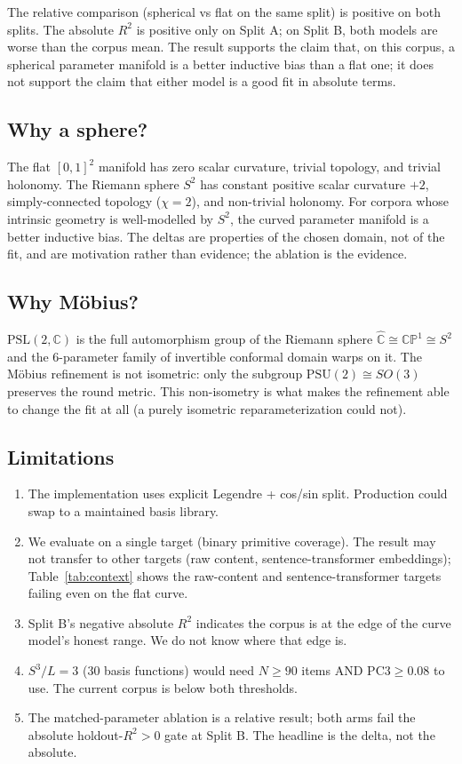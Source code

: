 \documentclass[11pt,a4paper]{article}
\begin{document}
The relative comparison (spherical vs flat on the same split) is positive on both splits. The absolute $R^2$ is positive only on Split A; on Split B, both models are worse than the corpus mean. The result supports the claim that, on this corpus, a spherical parameter manifold is a better inductive bias than a flat one; it does not support the claim that either model is a good fit in absolute terms.

\subsection{Why a sphere?}

The flat $[0,1]^2$ manifold has zero scalar curvature, trivial topology, and trivial holonomy. The Riemann sphere $S^2$ has constant positive scalar curvature $+2$, simply-connected topology ($\chi = 2$), and non-trivial holonomy. For corpora whose intrinsic geometry is well-modelled by $S^2$, the curved parameter manifold is a better inductive bias. The deltas are properties of the chosen domain, not of the fit, and are motivation rather than evidence; the ablation is the evidence.

\subsection{Why Möbius?}

$\mathrm{PSL}(2,\mathbb{C})$ is the full automorphism group of the Riemann sphere $\widehat{\mathbb{C}} \cong \mathbb{CP}^1 \cong S^2$ and the 6-parameter family of invertible conformal domain warps on it. The Möbius refinement is not isometric: only the subgroup $\mathrm{PSU}(2) \cong SO(3)$ preserves the round metric. This non-isometry is what makes the refinement able to change the fit at all (a purely isometric reparameterization could not).

\subsection{Limitations}

\begin{enumerate}
\item The implementation uses explicit Legendre + cos/sin split. Production could swap to a maintained basis library.
\item We evaluate on a single target (binary primitive coverage). The result may not transfer to other targets (raw content, sentence-transformer embeddings); Table~\ref{tab:context} shows the raw-content and sentence-transformer targets failing even on the flat curve.
\item Split B's negative absolute $R^2$ indicates the corpus is at the edge of the curve model's honest range. We do not know where that edge is.
\item $S^3/L=3$ (30 basis functions) would need $N \geq 90$ items AND $\mathrm{PC3} \geq 0.08$ to use. The current corpus is below both thresholds.
\item The matched-parameter ablation is a relative result; both arms fail the absolute holdout-$R^2 > 0$ gate at Split B. The headline is the delta, not the absolute.
\end{enumerate}
\end{document}
